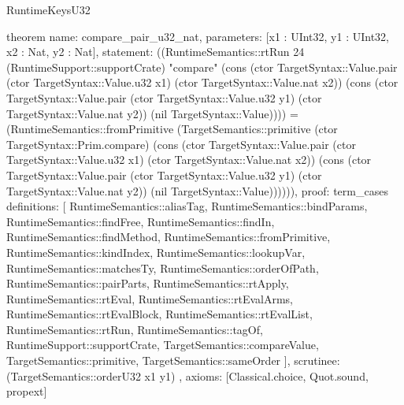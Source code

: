 \begin{lexlean}{RuntimeKeysU32}
\begin{semanticmodule}
theorem{
  name: compare_pair_u32_nat,
  parameters: [x1 : UInt32, y1 : UInt32, x2 : Nat, y2 : Nat],
  statement: ((RuntimeSemantics::rtRun 24 (RuntimeSupport::supportCrate) "compare" (cons (ctor TargetSyntax::Value.pair (ctor TargetSyntax::Value.u32 x1) (ctor TargetSyntax::Value.nat x2)) (cons (ctor TargetSyntax::Value.pair (ctor TargetSyntax::Value.u32 y1) (ctor TargetSyntax::Value.nat y2)) (nil TargetSyntax::Value)))) = (RuntimeSemantics::fromPrimitive (TargetSemantics::primitive (ctor TargetSyntax::Prim.compare) (cons (ctor TargetSyntax::Value.pair (ctor TargetSyntax::Value.u32 x1) (ctor TargetSyntax::Value.nat x2)) (cons (ctor TargetSyntax::Value.pair (ctor TargetSyntax::Value.u32 y1) (ctor TargetSyntax::Value.nat y2)) (nil TargetSyntax::Value)))))),
  proof: term_cases{
    definitions: [
      RuntimeSemantics::aliasTag,
      RuntimeSemantics::bindParams,
      RuntimeSemantics::findFree,
      RuntimeSemantics::findIn,
      RuntimeSemantics::findMethod,
      RuntimeSemantics::fromPrimitive,
      RuntimeSemantics::kindIndex,
      RuntimeSemantics::lookupVar,
      RuntimeSemantics::matchesTy,
      RuntimeSemantics::orderOfPath,
      RuntimeSemantics::pairParts,
      RuntimeSemantics::rtApply,
      RuntimeSemantics::rtEval,
      RuntimeSemantics::rtEvalArms,
      RuntimeSemantics::rtEvalBlock,
      RuntimeSemantics::rtEvalList,
      RuntimeSemantics::rtRun,
      RuntimeSemantics::tagOf,
      RuntimeSupport::supportCrate,
      TargetSemantics::compareValue,
      TargetSemantics::primitive,
      TargetSemantics::sameOrder
    ],
    scrutinee: (TargetSemantics::orderU32 x1 y1)
  },
  axioms: [Classical.choice, Quot.sound, propext]
}


\end{semanticmodule}
\end{lexlean}
